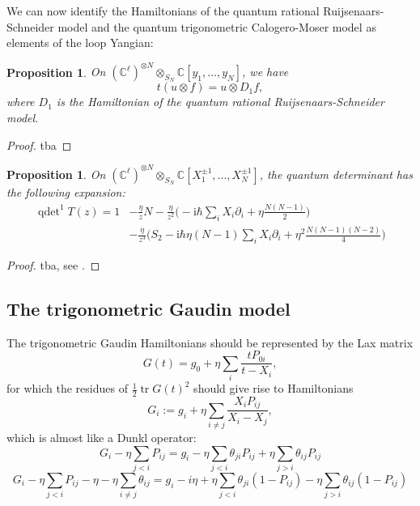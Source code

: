 \documentclass[11pt]{report}
\newtheorem{prop}[theorem]{Proposition}
\theoremstyle{definition}
\theoremstyle{remark}
\theoremstyle{remark}
\newcommand{\C}{\mathbb{C}}
\newcommand{\I}{\mathrm{i}}
\begin{document}
We can now identify the Hamiltonians of the quantum rational Ruijsenaars-Schneider model and the quantum trigonometric Calogero-Moser model as elements of the loop Yangian:

\begin{prop}
On $(\C^\ell)^{\otimes N} \otimes_{S_N} \C[y_1,...,y_N]$, we have
\begin{equation*}
t(u \otimes f) = u \otimes D_1 f,
\end{equation*}
where $D_1$ is the Hamiltonian of the quantum rational Ruijsenaars-Schneider model.
\end{prop}

\begin{proof}
tba
\end{proof}

\begin{prop}
On $(\C^\ell)^{\otimes N} \otimes_{S_N} \C[X_1^{\pm 1},...,X_N^{\pm 1}]$, the quantum determinant has the following expansion:
\begin{align*}
\operatorname{qdet}^1 T(z)
= 1 &- \frac{\eta}{z} N - \frac{\eta}{z^2} \bigg( -\I \hbar \sum_i X_i \partial_i + \eta \frac{N(N-1)}{2} \bigg) \\
&- \frac{\eta}{z^3} \bigg( S_2 - \I \hbar \eta (N-1) \sum_i X_i \partial_i + \eta^2 \frac{N(N-1)(N-2)}{4} \bigg)
\end{align*}
\end{prop}

\begin{proof}
tba, see \cite{article:bernard:1993}.
\end{proof}

\subsection{The trigonometric Gaudin model}

The trigonometric Gaudin Hamiltonians should be represented by the Lax matrix
\begin{equation*}
G(t) = g_0 + \eta \sum_i \frac{tP_{0i}}{t-X_i},
\end{equation*}
for which the residues of $\frac{1}{2} \operatorname{tr} G(t)^2$ should give rise to Hamiltonians
\begin{equation*}
G_i := g_i + \eta \sum_{i \neq j} \frac{X_i P_{ij}}{X_i-X_j},
\end{equation*}
which is almost like a Dunkl operator:
\begin{equation*}
G_i - \eta \sum_{j < i} P_{ij} = g_i - \eta \sum_{j < i} \theta_{ji} P_{ij} + \eta \sum_{j > i} \theta_{ij} P_{ij}
\end{equation*}
\begin{equation*}
G_i - \eta \sum_{j < i} P_{ij} - \eta - \eta \sum_{i \neq j} \theta_{ij} =
g_i - i\eta + \eta \sum_{j < i} \theta_{ji} (1-P_{ij}) - \eta \sum_{j > i} \theta_{ij} (1-P_{ij})
\end{equation*}
\end{document}
